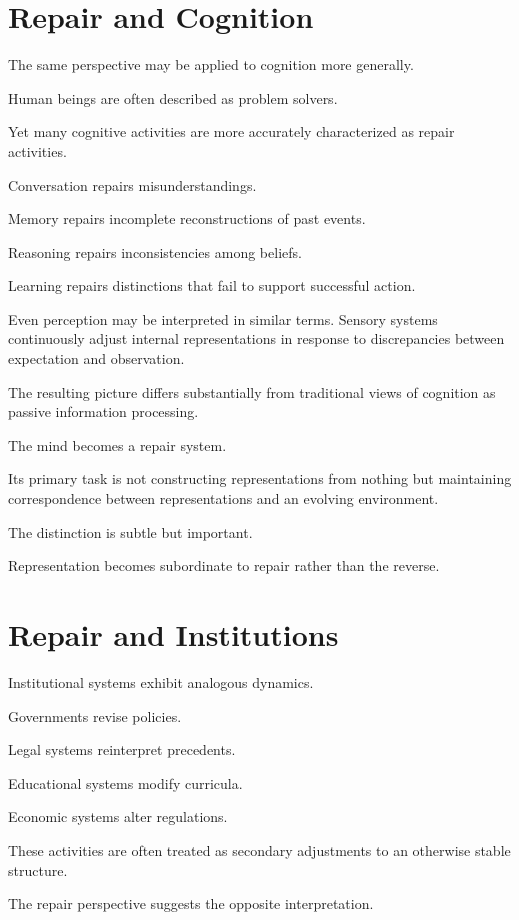 \documentclass[11pt,oneside,openany]{book}
\begin{document}
\section{Repair and Cognition}

The same perspective may be applied to cognition more generally.

Human beings are often described as problem solvers.

Yet many cognitive activities are more accurately characterized as repair activities.

Conversation repairs misunderstandings.

Memory repairs incomplete reconstructions of past events.

Reasoning repairs inconsistencies among beliefs.

Learning repairs distinctions that fail to support successful action.

Even perception may be interpreted in similar terms. Sensory systems continuously adjust internal representations in response to discrepancies between expectation and observation.

The resulting picture differs substantially from traditional views of cognition as passive information processing.

The mind becomes a repair system.

Its primary task is not constructing representations from nothing but maintaining correspondence between representations and an evolving environment.

The distinction is subtle but important.

Representation becomes subordinate to repair rather than the reverse.

\section{Repair and Institutions}

Institutional systems exhibit analogous dynamics.

Governments revise policies.

Legal systems reinterpret precedents.

Educational systems modify curricula.

Economic systems alter regulations.

These activities are often treated as secondary adjustments to an otherwise stable structure.

The repair perspective suggests the opposite interpretation.
\end{document}
